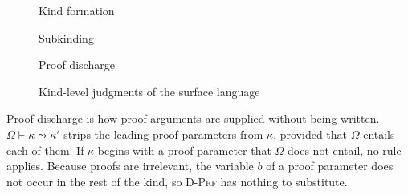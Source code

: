 \documentclass[11pt]{article}
\newcommand{\kw}[1]{\mathsf{#1}}
\newcommand{\prf}[1]{\kw{prf}\;#1}
\newcommand{\proper}{\ast}
\newcommand{\populated}{\ast^{+}}
\newcommand{\kall}[3]{\forall #1 : #2.\,#3}
\newcommand{\proves}{\Vdash}
\newcommand{\discharge}[3]{#1 \vdash #2 \leadsto #3}
\newcommand{\rulename}[1]{\textsc{#1}}
\newcommand{\judgmentbox}[2]{\medskip\noindent\fbox{$#1$}\quad #2\par\vspace{-1.2\baselineskip}}
\theoremstyle{remark}
\begin{document}
\begin{figure}[!htbp]
\judgmentbox{\Omega \vdash \kappa}{Kind formation}

\judgmentbox{\kappa \leq \kappa'}{Subkinding}

\judgmentbox{\discharge{\Omega}{\kappa}{\kappa'}}{Proof discharge}
\caption{Kind-level judgments of the surface language}
\label{fig:kind-judgments}
\end{figure}

Proof discharge is how proof arguments are supplied without being written.
$\discharge{\Omega}{\kappa}{\kappa'}$ strips the leading proof parameters from $\kappa$, provided
that $\Omega$ entails each of them. If $\kappa$ begins with a proof parameter that $\Omega$ does not
entail, no rule applies. Because proofs are irrelevant, the variable $b$ of a proof parameter does
not occur in the rest of the kind, so \rulename{D-Prf} has nothing to substitute.
\end{document}
